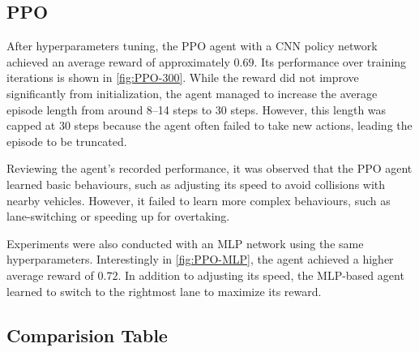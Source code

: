 \documentclass{article}
\begin{document}
 

\subsection{PPO}
After hyperparameters tuning, the PPO agent with a CNN policy network achieved an average reward of approximately $0.69$. Its performance over training iterations is shown in \autoref{fig:PPO-300}. While the reward did not improve significantly from initialization, the agent managed to increase the average episode length from around 8–14 steps to 30 steps. However, this length was capped at 30 steps because the agent often failed to take new actions, leading the episode to be truncated. 

Reviewing the agent's recorded performance, it was observed that the PPO agent learned basic behaviours, such as adjusting its speed to avoid collisions with nearby vehicles. However, it failed to learn more complex behaviours, such as lane-switching or speeding up for overtaking.

Experiments were also conducted with an MLP network using the same hyperparameters. Interestingly in \autoref{fig:PPO-MLP}, the agent achieved a higher average reward of $0.72$. In addition to adjusting its speed, the MLP-based agent learned to switch to the rightmost lane to maximize its reward.

\subsection{Comparision Table}
\end{document}
